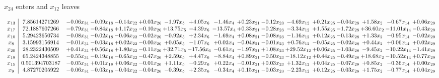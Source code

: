 \documentclass[9pt]{article}
\begin{document}
 $ x_{24} $ enters and $ x_{12} $ leaves 

 \[\begin{array}{c| c c@{\hskip 2pt} c@{\hskip 2pt} c@{\hskip 2pt} c@{\hskip 2pt} c@{\hskip 2pt} c@{\hskip 2pt} c@{\hskip 2pt} c@{\hskip 2pt} c@{\hskip 2pt} c@{\hskip 2pt} c@{\hskip 2pt} c@{\hskip 2pt} c@{\hskip 2pt} c@{\hskip 2pt} c@{\hskip 2pt} }
 x_{13}   &  7.85614271269 & -0.06 x_{31} & -0.09 x_{18} & -0.14 x_{22} & +  0.03 x_{26} & -1.97 x_{5} & +  4.05 x_{6} & -1.46 x_{4} & +  0.23 x_{21} & -0.12 x_{23} & -4.69 x_{12} & +  0.21 x_{25} & -0.04 x_{28} & +  1.58 x_{2} & -0.67 x_{14} & +  0.06 x_{29}\\
 x_{17}   &  72.1887607266 & -0.79 x_{31} & -0.84 x_{18} & +  1.17 x_{22} & -0.10 x_{26} & + 13.75 x_{5} & -4.39 x_{6} & -13.57 x_{4} & +  0.33 x_{21} & -0.28 x_{23} & -3.34 x_{12} & +  1.55 x_{25} & -1.72 x_{28} & + 36.60 x_{2} & -11.01 x_{14} & -0.43 x_{29}\\
 x_{10}   &  5.29423650734 & -0.08 x_{31} & -0.02 x_{18} & -0.06 x_{22} & -0.02 x_{26} & -0.92 x_{5} & +  2.34 x_{6} & -1.69 x_{4} & +  0.08 x_{21} & -0.08 x_{23} & -1.16 x_{12} & +  0.12 x_{25} & -0.13 x_{28} & +  1.33 x_{2} & -0.95 x_{14} & -0.02 x_{29}\\
 x_{8}   &  3.15993156914 & -0.01 x_{31} & -0.03 x_{18} & +  0.02 x_{22} & -0.00 x_{26} & +  0.05 x_{5} & -1.07 x_{6} & +  0.02 x_{4} & -0.04 x_{21} & -0.01 x_{23} & +  0.76 x_{12} & -0.05 x_{25} & -0.02 x_{28} & +  0.44 x_{2} & +  0.06 x_{14} & +  0.02 x_{29}\\
 x_{20}   &  28.2322430509 & +  0.41 x_{31} & +  0.56 x_{18} & +  1.80 x_{22} & -0.11 x_{26} & + 32.71 x_{5} & -17.56 x_{6} & -0.61 x_{4} & -1.97 x_{21} & +  1.08 x_{23} & + 29.52 x_{12} & +  0.06 x_{25} & -1.03 x_{28} & -9.45 x_{2} & -10.22 x_{14} & -1.41 x_{29}\\
 x_{19}   &  65.2424348855 & -0.55 x_{31} & -0.19 x_{18} & -0.65 x_{22} & -0.47 x_{26} & +  2.59 x_{5} & +  4.47 x_{6} & -8.84 x_{4} & +  0.89 x_{21} & -0.50 x_{23} & -18.12 x_{12} & +  0.44 x_{25} & -0.49 x_{28} & + 18.68 x_{2} & -10.52 x_{14} & +  0.77 x_{29}\\
 x_{15}   &  0.501394703187 & -0.05 x_{31} & +  0.01 x_{18} & +  0.06 x_{22} & -0.01 x_{26} & +  1.11 x_{5} & -0.29 x_{6} & +  0.22 x_{4} & -0.01 x_{21} & +  0.03 x_{23} & +  1.32 x_{12} & +  0.04 x_{25} & -0.07 x_{28} & +  0.85 x_{2} & -0.36 x_{14} & +  0.00 x_{29}\\
 x_{9}   &  4.87270205922 & -0.06 x_{31} & -0.03 x_{18} & -0.04 x_{22} & -0.04 x_{26} & -0.39 x_{5} & +  2.35 x_{6} & -0.34 x_{4} & +  0.15 x_{21} & -0.03 x_{23} & -2.23 x_{12} & +  0.12 x_{25} & -0.03 x_{28} & +  1.75 x_{2} & -0.77 x_{14} & +  0.04 x_{29}\\

\end{array}\]
\end{document}

